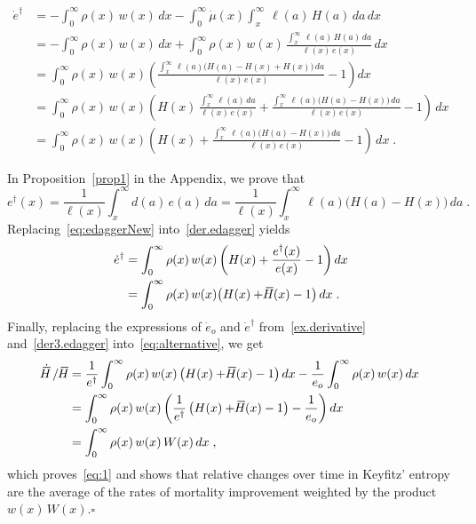 \documentclass[a4paper,twoside, openright, 12pt, leqno]{article}
\newcommand*\xbar[1]{%
   \hbox{%
     \vbox{%
       \hrule height 0.5pt %
       \kern0.3ex%
       \hbox{%
         \kern-0.25em%
         \ensuremath{#1}%
         \kern-0.05em%
       }%
     }%
   }%
}
\begin{document}
\begin{equation}
 \begin{split}
 \dot{e}^\dagger	
    & = -\int_0^\infty\rho(x)\,w(x)\,dx-\int_0^\infty\dot{\mu}(x)\int_x^\infty\,\ell(a)\,H(a)\,da\,dx    \\
    & = -\int_0^\infty\rho(x)\,w(x)\,dx+\int_0^\infty\rho(x)\,w(x)\,\frac{\int_x^\infty\,\ell(a)\,H(a)\,da}{\ell(x)\,e(x)}\,dx                                   \\
    & =\int_0^\infty\rho(x)\,w(x)\left(\frac{\int_x^\infty\,\ell(a)\big(H(a)-H(x)+H(x)\big)\,da}{\ell(x)\,e(x)}-1\right)dx                  \\
    & =\int_0^\infty\rho(x)\,w(x)\left(H(x)\,\frac{\int_x^\infty\,\ell(a)\,da}{\ell(x)\,e(x)}+\frac{\int_x^\infty\,\ell(a)\big(H(a)-H(x)\big)\,da}{\ell(x)\,e(x)}-1\right)\,dx                                           \\
    & =\int_0^\infty\rho(x)\,w(x)\left(H(x)+\frac{\int_x^\infty\,\ell(a)\big(H(a)-H(x)\big)\,da}{\ell(x)\,e(x)}-1\right)\,dx\;.
 \label{der.edagger}
 \end{split}
\end{equation}

In Proposition~\ref{prop1} in the Appendix, we prove that
%
\begin{equation}
e^\dagger(x)=\frac{1}{\ell(x)}\int_x^\infty d(a)\,e(a)\,da=\frac{1}{\ell(x)}\int_x^\infty\,\ell(a)\big(H(a)-H(x)\big)\,da\;.
\label{eq:edaggerNew}
\end{equation}
%
Replacing~\eqref{eq:edaggerNew} into~\eqref{der.edagger} yields
%
\begin{equation}
  \begin{split}
    \dot{e}^\dagger
        & = \int_0^\infty\rho(x)\,w(x)\left(H(x)+\frac{e^\dagger(x)}{e(x)}-1\right)dx                 \\
        & = \int_0^\infty\rho(x)\,w(x)\big(H(x)+\xbar{H}(x)-1\big)\,dx   \;.
  \end{split}
  \label{der3.edagger}
\end{equation}
%
Finally, replacing the expressions of $\dot{e}_o$ and $\dot{e}^\dagger$ from~\eqref{ex.derivative} and~\eqref{der3.edagger} into~\eqref{eq:alternative}, we get 
%
\begin{equation*}
 \begin{split}
    \dot{\xbar{H}}\,/\,\xbar{H}
        & = \frac{1}{e^\dagger}\int_0^\infty\rho(x)\,w(x)\left(H(x)+\xbar{H}(x)-1\right)dx-\frac{1}{e_o}\int_0^\infty\rho(x)\,w(x)\,dx    \\
        & = \int_0^\infty\rho(x)\,w(x)\left(\frac{1}{e^\dagger}\left(H(x)+\xbar{H}(x)-1\right)-\frac{1}{e_o}\right)dx                               \\
        & = \int_0^\infty\rho(x)\,w(x)\,W(x)\,dx\;,
 \end{split}
\end{equation*}
%
which proves~\eqref{eq:1} and shows that relative changes over time in Keyfitz' entropy are the average of the rates of mortality improvement weighted by the product $w(x)\,W(x)$.\hfill$\square$
\end{document}
